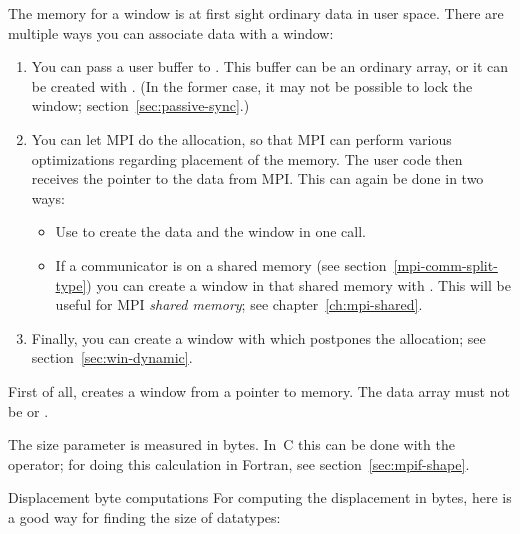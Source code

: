 The memory for a window is at first sight ordinary data in user space. There are multiple
ways you can associate data with a window:
\begin{enumerate}
\item You can pass a user buffer to
  . This buffer can be an ordinary array,
  or it can be created with .
  (In the former case, it may not be possible to lock the window;
  section~\ref{sec:passive-sync}.)
\item You can let MPI do the allocation, so that MPI can perform various
  optimizations regarding placement of the memory. The user code then
  receives the pointer to the data from MPI. This can again be done in two ways:
  \begin{itemize}
  \item Use  to create the data and the
    window in one call.
  \item If a communicator is on a shared memory (see
    section~\ref{mpi-comm-split-type}) you can create a window in that
    shared memory with .
    This will be useful for
    MPI \emph{shared memory};
    see chapter~\ref{ch:mpi-shared}.
  \end{itemize}
\item Finally, you can create a window with
   which postpones the allocation;
  see section~\ref{sec:win-dynamic}.
\end{enumerate}

First of all, 
creates a window from a pointer to memory.
The data array must not be  or .

The size parameter is measured in bytes. In~C this can be done
with the  operator;
%
%
for doing this calculation in Fortran, see section~\ref{sec:mpif-shape}.

\begin{pythonnote}{Displacement byte computations}
  For computing the displacement in bytes,
  here is a good way for finding the size of  datatypes:
\end{pythonnote}

